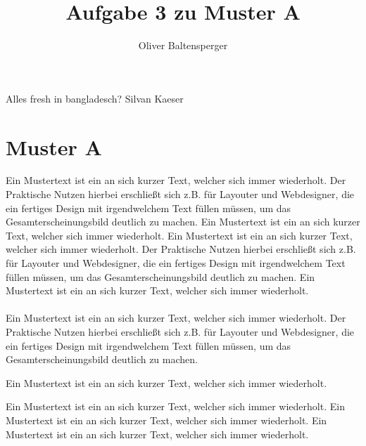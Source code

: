 \documentclass{article}
\title{Aufgabe 3 zu Muster A}
\author{Oliver Baltensperger}
\begin{document}
\maketitle
{}
Alles fresh in bangladesch? Silvan Kaeser
\section{Muster A}
Ein Mustertext ist ein an sich kurzer Text, welcher sich immer wiederholt. Der Praktische Nutzen hierbei erschließt sich z.B. für Layouter und Webdesigner, die ein fertiges Design mit irgendwelchem Text füllen müssen, um das Gesamterscheinungsbild deutlich zu machen. Ein Mustertext ist ein an sich kurzer Text, welcher sich immer wiederholt. Ein Mustertext ist ein an sich kurzer Text, welcher sich immer wiederholt. Der Praktische Nutzen hierbei erschließt sich z.B. für Layouter und Webdesigner, die ein fertiges Design mit irgendwelchem Text füllen müssen, um das
Gesamterscheinungsbild deutlich zu machen. Ein Mustertext ist ein an sich kurzer Text, welcher sich immer wiederholt.\citep{meusel2005entwicklung} \\
\\
Ein Mustertext ist ein an sich kurzer Text, welcher sich immer wiederholt. Der Praktische Nutzen hierbei erschließt sich z.B. für Layouter und Webdesigner, die ein fertiges Design mit irgendwelchem Text füllen müssen, um das Gesamterscheinungsbild deutlich zu machen.  \citep{hawking1993brief}

\begin{center}
Ein Mustertext ist ein an sich kurzer Text, welcher sich immer wiederholt. 
\end{center}

Ein Mustertext ist ein an sich kurzer Text, welcher sich immer wiederholt. Ein Mustertext ist ein an sich kurzer Text, welcher sich immer wiederholt. Ein Mustertext ist ein an sich kurzer Text, welcher sich immer wiederholt.\citep{nicolaou2013aufkommen} 


{}
\end{document}
